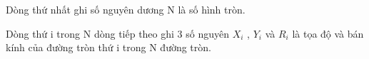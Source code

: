 Dòng thứ nhất ghi số nguyên dương N là số hình tròn.  

   Dòng thứ i trong N dòng tiếp theo ghi 3 số nguyên $X_{i}$   , $Y_{i}$   và $R_{i}$   là tọa độ và bán kính của đường tròn thứ i trong N đường tròn.